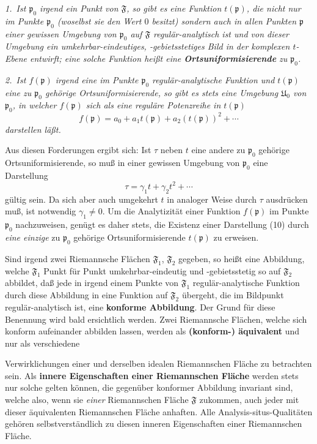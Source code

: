 \documentclass{article}
\begin{document}
\emph{1.~Ist $\mathfrak{p}_0$ irgend ein Punkt von $\mathfrak{F}$, so gibt es eine Funktion $t(\mathfrak{p})$, die nicht nur im Punkte $\mathfrak{p}_0$ (woselbst sie den Wert $0$ besitzt) sondern auch in allen Punkten $\mathfrak{p}$ einer gewissen Umgebung von $\mathfrak{p}_0$ auf $\mathfrak{F}$ regulär-analytisch ist und von dieser Umgebung ein umkehrbar-eindeutiges, -gebietsstetiges Bild in der komplexen $t$-Ebene entwirft; eine solche Funktion heißt eine \textbf{Ortsuniformisierende} zu $\mathfrak{p}_0$.}

\emph{2.~Ist $f(\mathfrak{p})$ irgend eine im Punkte $\mathfrak{p}_0$ regulär-analytische Funktion und $t(\mathfrak{p})$ eine zu $\mathfrak{p}_0$ gehörige Ortsuniformisierende, so gibt es stets eine Umgebung $\mathfrak{U}_0$ von $\mathfrak{p}_0$, in welcher $f(\mathfrak{p})$ sich als eine reguläre Potenzreihe in $t(\mathfrak{p})$}
\[ f(\mathfrak{p}) = a_0 + a_1 t(\mathfrak{p}) + a_2 (t(\mathfrak{p}))^2 + \cdots \tag{10} \]
\emph{darstellen läßt.}

Aus diesen Forderungen ergibt sich: Ist $\tau$ neben $t$ eine andere zu $\mathfrak{p}_0$ gehörige Ortsuniformisierende, so muß in einer gewissen Umgebung von $\mathfrak{p}_0$ eine Darstellung
\[ \tau = \gamma_1 t + \gamma_2 t^2 + \cdots \]
gültig sein. Da sich aber auch umgekehrt $t$ in analoger Weise durch $\tau$ ausdrücken muß, ist notwendig $\gamma_1 \neq 0$. Um die Analytizität einer Funktion $f(\mathfrak{p})$ im Punkte $\mathfrak{p}_0$ nachzuweisen, genügt es daher stets, die Existenz einer Darstellung (10) durch \emph{eine einzige} zu $\mathfrak{p}_0$ gehörige Ortsuniformisierende $t(\mathfrak{p})$ zu erweisen.

Sind irgend zwei Riemannsche Flächen $\mathfrak{F}_1$, $\mathfrak{F}_2$ gegeben, so heißt eine Abbildung, welche $\mathfrak{F}_1$ Punkt für Punkt umkehrbar-eindeutig und -gebietsstetig so auf $\mathfrak{F}_2$ abbildet, daß jede in irgend einem Punkte von $\mathfrak{F}_1$ regulär-analytische Funktion durch diese Abbildung in eine Funktion auf $\mathfrak{F}_2$ übergeht, die im Bildpunkt regulär-analytisch ist, eine \textbf{konforme Abbildung}. Der Grund für diese Benennung wird bald ersichtlich werden. Zwei Riemannsche Flächen, welche sich konform aufeinander abbilden lassen, werden als \textbf{(konform-) äquivalent} und nur als verschiedene

Verwirklichungen einer und derselben idealen Riemannschen Fläche zu betrachten sein. Als \textbf{innere Eigenschaften einer Riemannschen Fläche} werden stets nur solche gelten können, die gegenüber konformer Abbildung invariant sind, welche also, wenn sie \emph{einer} Riemannschen Fläche $\mathfrak{F}$ zukommen, auch jeder mit dieser äquivalenten Riemannschen Fläche anhaften. Alle Analysis-situs-Qualitäten gehören selbstverständlich zu diesen inneren Eigenschaften einer Riemannschen Fläche.
\end{document}
